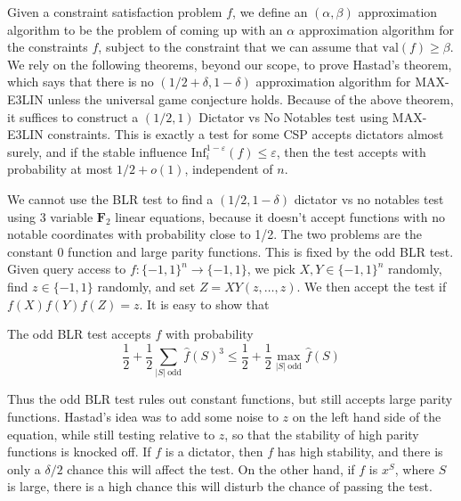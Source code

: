 Given a constraint satisfaction problem $f$, we define an $(\alpha, \beta)$ approximation algorithm to be the problem of coming up with an $\alpha$ approximation algorithm for the constraints $f$, subject to the constraint that we can assume that $\text{val}(f) \geq \beta$. We rely on the following theorems, beyond our scope, to prove Hastad's theorem, which says that there is no $(1/2 + \delta, 1 - \delta)$ approximation algorithm for MAX-E3LIN unless the universal game conjecture holds. Because of the above theorem, it suffices to construct a $(1/2,1)$ Dictator vs No Notables test using MAX-E3LIN constraints. This is exactly a test for some CSP accepts dictators almost surely, and if the stable influence $\text{Inf}_i^{1-\varepsilon}(f) \leq \varepsilon$, then the test accepts with probability at most $1/2 + o(1)$, independent of $n$.

We cannot use the BLR test to find a $(1/2, 1 - \delta)$ dictator vs no notables test using 3 variable $\mathbf{F}_2$ linear equations, because  it doesn't accept functions with no notable coordinates with probability close to 1/2. The two problems are the constant 0 function and large parity functions. This is fixed by the odd BLR test. Given query access to $f: \{ -1, 1 \}^n \to \{ -1, 1 \}$, we pick $X,Y \in \{ -1, 1 \}^n$ randomly, find $z \in \{ -1, 1 \}$ randomly, and set $Z = XY(z,\dots,z)$. We then accept the test if $f(X) f(Y) f(Z) = z$. It is easy to show that

\begin{theorem}
    The odd BLR test accepts $f$ with probability
    \[ \frac{1}{2} + \frac{1}{2} \sum_{|S|\ \text{odd}} \widehat{f}(S)^3 \leq \frac{1}{2} + \frac{1}{2} \max_{|S|\ \text{odd}} \widehat{f}(S) \]
\end{theorem}
%
Thus the odd BLR test rules out constant functions, but still accepts large parity functions. Hastad's idea was to add some noise to $z$ on the left hand side of the equation, while still testing relative to $z$, so that the stability of high parity functions is knocked off. If $f$ is a dictator, then $f$ has high stability, and there is only a $\delta/2$ chance this will affect the test. On the other hand, if $f$ is $x^S$, where $S$ is large, there is a high chance this will disturb the chance of passing the test.

